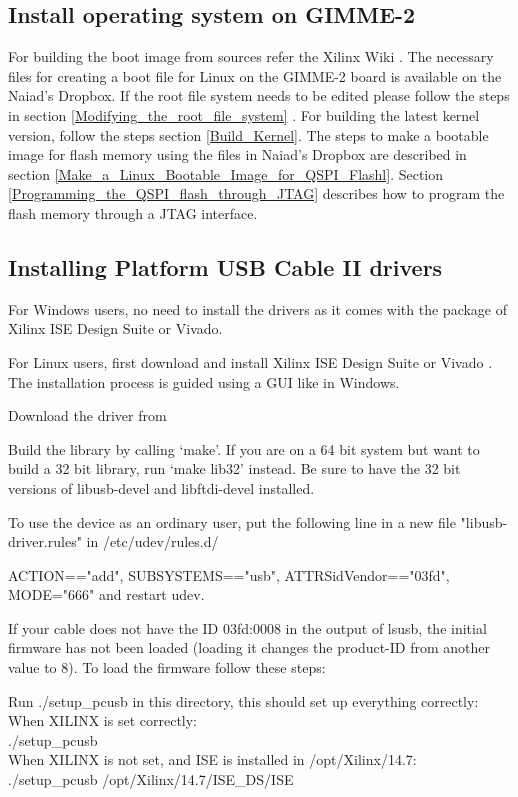 \subsection{Install operating system on GIMME-2}
For building the boot image from sources refer the Xilinx Wiki . The necessary files for creating a boot file for Linux on the GIMME-2 board is available on the Naiad’s Dropbox. If the root file system needs to be edited please follow the steps in section  \ref{Modifying_the_root_file_system} . For building the latest kernel version, follow the steps section  \ref{Build_Kernel}. The steps to make a bootable image for flash memory using the files in Naiad’s Dropbox are described in section  \ref{Make_a_Linux_Bootable_Image_for_QSPI_Flashl}. Section \ref{Programming_the_QSPI_flash_through_JTAG} describes how to program the flash memory through a JTAG interface.

\subsection{Installing Platform USB Cable II drivers}
For Windows users, no need to install the drivers as it comes with the package of Xilinx ISE Design Suite or Vivado.

For Linux users, first download and install Xilinx ISE Design Suite \cite{XilinxDesign} or Vivado \cite{Vivado}.
The installation process is guided using a GUI like in Windows.

Download the driver from \cite{USBDriver}

Build the library by calling `make'. If you are on a 64 bit system but want to build a 32 bit library, run `make lib32' instead. Be sure to have the 32 bit versions of libusb-devel and libftdi-devel installed.

To use the device as an ordinary user, put the following line in a new file "libusb-driver.rules" in /etc/udev/rules.d/  

ACTION=="add", SUBSYSTEMS=="usb", ATTRS{idVendor}=="03fd", MODE="666"
and restart udev.

If your cable does not have the ID 03fd:0008 in the output of lsusb, the initial firmware has not been loaded (loading it changes the
product-ID from another value to 8). To load the firmware follow these steps:

Run ./setup\_pcusb in this directory, this should set up everything correctly: \\
   When XILINX is set correctly: \\
      ./setup\_pcusb \\
    When XILINX is not set, and ISE is installed in /opt/Xilinx/14.7: \\
      ./setup\_pcusb /opt/Xilinx/14.7/ISE\_DS/ISE 

